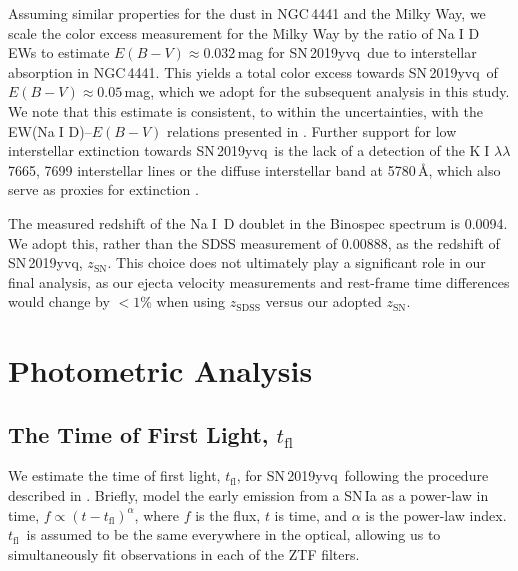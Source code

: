 \documentclass[twocolumn]{aastex63}
\def\ion#1#2{#1$\;${\footnotesize\rm{#2}}\relax}
\newcommand{\tfl}{$t_\mathrm{fl}$}
\newcommand{\sn}{SN\,2019yvq}
\begin{document}
Assuming similar properties for the dust in NGC\,4441 and the Milky Way, we
scale the color excess measurement for the Milky Way by the ratio of
\ion{Na}{I} D EWs to estimate $E(B-V) \approx 0.032$\,mag for \sn\ due to
interstellar absorption in NGC\,4441. This yields a total color excess towards
\sn\ of $E(B-V) \approx 0.05$\,mag, which we adopt for the subsequent analysis
in this study. We note that this estimate is consistent, to within the
uncertainties, with the EW(\ion{Na}{I} D)--$E(B-V)$ relations presented in
\citet{Poznanski12}. Further support for low interstellar extinction towards
\sn\ is the lack of a detection of the \ion{K}{I} $\lambda\lambda$7665, 7699
interstellar lines or the diffuse interstellar band at 5780\,\AA, which also
serve as proxies for extinction \citep{Phillips13}.

The measured redshift of the \ion{Na}{I}~D doublet in the Binospec spectrum is
0.0094. We adopt this, rather than the SDSS measurement of 0.00888, as the
redshift of \sn, $z_\mathrm{SN}$. This choice does not ultimately play a
significant role in our final analysis, as our ejecta velocity measurements
and rest-frame time differences would change by $<1\%$ when using
$z_\mathrm{SDSS}$ versus our adopted $z_\mathrm{SN}$.


\section{Photometric Analysis}\label{sec:phot}

\subsection{The Time of First Light, \tfl}\label{sec:t_fl}

We estimate the time of first light, \tfl, for \sn\ following the procedure
described in \citet{Miller20}. Briefly, \citet{Miller20} model the early
emission from a SN\,Ia as a power-law in time, $f \propto (t -
t_\mathrm{fl})^\alpha$, where $f$ is the flux, $t$ is time, and $\alpha$ is
the power-law index. \tfl\ is assumed to be the same everywhere in the
optical, allowing us to simultaneously fit observations in each of the ZTF
filters.
\end{document}
